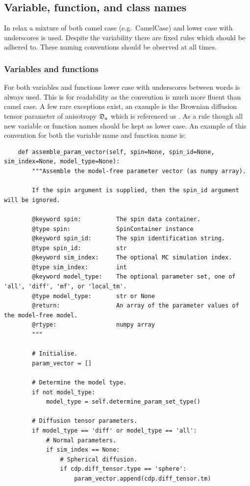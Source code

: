 \subsection{Variable, function, and class names}

In relax a mixture of both camel case (e.g.\ CamelCase) and lower case with underscores is used.
Despite the variability there are fixed rules which should be adhered to.
These naming conventions should be observed at all times.



\subsubsection{Variables and functions}

For both variables and functions lower case with underscores between words is always used.
This is for readability as the convention is much more fluent than camel case.
A few rare exceptions exist, an example is the Brownian diffusion tensor parameter of anisotropy $\mathfrak{D}_a$ which is referenced as .
As a rule though all new variable or function names should be kept as lower case.
An example of this convention for both the variable name and function name is:

\begin{lstlisting}
    def assemble_param_vector(self, spin=None, spin_id=None, sim_index=None, model_type=None):
        """Assemble the model-free parameter vector (as numpy array).

        If the spin argument is supplied, then the spin_id argument will be ignored.

        @keyword spin:          The spin data container.
        @type spin:             SpinContainer instance
        @keyword spin_id:       The spin identification string.
        @type spin_id:          str
        @keyword sim_index:     The optional MC simulation index.
        @type sim_index:        int
        @keyword model_type:    The optional parameter set, one of 'all', 'diff', 'mf', or 'local_tm'. 
        @type model_type:       str or None
        @return:                An array of the parameter values of the model-free model.
        @rtype:                 numpy array
        """

        # Initialise.
        param_vector = []

        # Determine the model type.
        if not model_type:
            model_type = self.determine_param_set_type()

        # Diffusion tensor parameters.
        if model_type == 'diff' or model_type == 'all':
            # Normal parameters.
            if sim_index == None:
                # Spherical diffusion.
                if cdp.diff_tensor.type == 'sphere':
                    param_vector.append(cdp.diff_tensor.tm)
\end{lstlisting}



